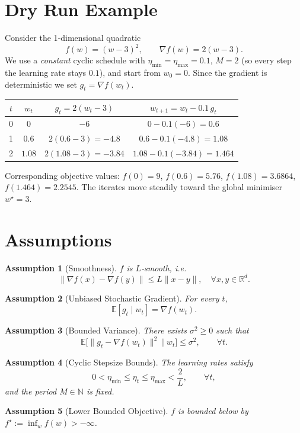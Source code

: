 \documentclass{article}
\newtheorem{assumption}{Assumption}
\newcommand{\E}{\mathbb{E}}
\newcommand{\R}{\mathbb{R}}
\begin{document}
\section*{Dry Run Example}
Consider the 1‑dimensional quadratic
\[
f(w) = (w-3)^2, \qquad \nabla f(w)=2(w-3).
\]
We use a \emph{constant} cyclic schedule with $\eta_{\min}=\eta_{\max}=0.1$,
$M=2$ (so every step the learning rate stays $0.1$), and start from $w_0=0$.
Since the gradient is deterministic we set $g_t=\nabla f(w_t)$.

\begin{center}
\begin{tabular}{c|c|c|c}
$t$ & $w_t$ & $g_t=2(w_t-3)$ & $w_{t+1}=w_t-0.1\,g_t$ \\ \hline
0 & $0$ & $-6$ & $0-0.1(-6)=0.6$ \\
1 & $0.6$ & $2(0.6-3)=-4.8$ & $0.6-0.1(-4.8)=1.08$ \\
2 & $1.08$ & $2(1.08-3)=-3.84$ & $1.08-0.1(-3.84)=1.464$ 
\end{tabular}
\end{center}
Corresponding objective values:
$f(0)=9$, $f(0.6)=5.76$, $f(1.08)=3.6864$, $f(1.464)=2.2545$.
The iterates move steadily toward the global minimiser $w^\star=3$.

\newpage
\section*{Assumptions}
\begin{assumption}[Smoothness]\label{ass:smooth}
$f$ is $L$‑smooth, i.e.
\[
\|\nabla f(x)-\nabla f(y)\| \le L\|x-y\|,\quad \forall x,y\in\R^{d}.
\tag{A1}
\]
\end{assumption}
\begin{assumption}[Unbiased Stochastic Gradient]\label{ass:unbiased}
For every $t$, 
\[
\E[g_t\mid w_t]=\nabla f(w_t).
\tag{A2}
\]
\end{assumption}
\begin{assumption}[Bounded Variance]\label{ass:variance}
There exists $\sigma^2\ge0$ such that
\[
\E\!\big[\|g_t-\nabla f(w_t)\|^{2}\mid w_t\big]\le\sigma^{2},
\qquad\forall t.
\tag{A3}
\]
\end{assumption}
\begin{assumption}[Cyclic Stepsize Bounds]\label{ass:stepsize}
The learning rates satisfy
\[
0<\eta_{\min}\le \eta_t\le\eta_{\max}<\frac{2}{L},
\qquad\forall t,
\tag{A4}
\]
and the period $M\in\mathbb{N}$ is fixed.
\end{assumption}
\begin{assumption}[Lower Bounded Objective]\label{ass:lower}
$f$ is bounded below by $f^\star:=\inf_{w}f(w)>-\infty$.
\end{assumption}
\end{document}
